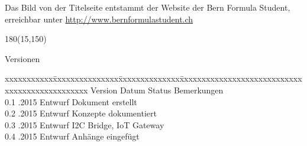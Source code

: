 \color{black}
Das Bild von der Titelseite entstammt der Website der Bern Formula Student, erreichbar unter \url{http://www.bernformulastudent.ch}

\begin{textblock}{180}(15,150)
\color{black}
\begin{huge}
Versionen
\end{huge}
\vspace{10mm}

\fontsize{10pt}{18pt}\selectfont
\begin{tabbing}
xxxxxxxxxxx\=xxxxxxxxxxxxxxx\=xxxxxxxxxxxxxx\=xxxxxxxxxxxxxxxxxxxxxxxxxxxxxxxxxxxxxxxxxxxxxxx \kill
Version	\> Datum	\> Status		\> Bemerkungen		\\
0.1	.2015	\> Entwurf		\> Dokument erstellt	\\	
0.2	.2015	\> Entwurf		\> Konzepte dokumentiert	\\ 
0.3	.2015	\> Entwurf		\> I2C Bridge, IoT Gateway	\\ 
0.4	.2015	\> Entwurf		\> Anhänge eingefügt	\\ 
\end{tabbing}

\end{textblock}
